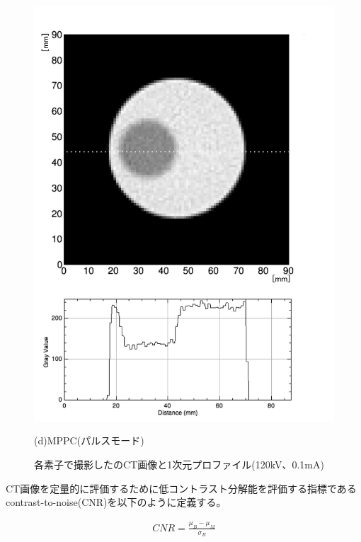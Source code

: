 \begin{figure}[H]
\begin{minipage}{0.5\hsize}
\begin{center}
    \includegraphics[bb=0.000000 0.000000 564.433340 778.975605,width=1.0\hsize]{image2/chapter5/low_contrast_MPPC_pulse_slice.png}
  \end{center}
  \vspace{-0.7cm}
   \caption*{(d)MPPC(パルスモード)}
 \end{minipage}
 \begin{center}
  \vspace{-1zh}
  \caption{各素子で撮影したのCT画像と1次元プロファイル(120kV、0.1mA)}
  \label{fig:lowcon1}
  \end{center}
\end{figure}


CT画像を定量的に評価するために低コントラスト分解能を評価する指標であるcontrast-to-noise(CNR)を以下のように定義する。

\begin{align}
CNR= \frac{\mu_B-\mu_M}{\sigma_B}\label{eq:cnr}
\end{align}

